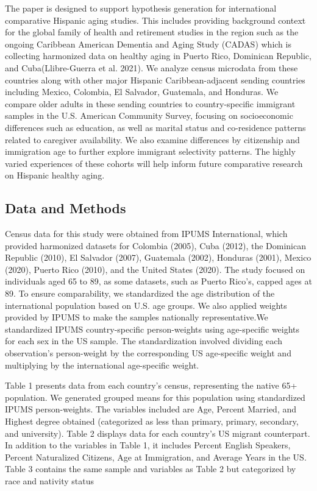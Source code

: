 \documentclass[
]{article}
\begin{document}
The paper is designed to support hypothesis generation for international
comparative Hispanic aging studies. This includes providing background
context for the global family of health and retirement studies in the
region such as the ongoing Caribbean American Dementia and Aging Study
(CADAS) which is collecting harmonized data on healthy aging in Puerto
Rico, Dominican Republic, and Cuba(Llibre-Guerra et al. 2021). We
analyze census microdata from these countries along with other major
Hispanic Caribbean-adjacent sending countries including Mexico,
Colombia, El Salvador, Guatemala, and Honduras. We compare older adults
in these sending countries to country-specific immigrant samples in the
U.S. American Community Survey, focusing on socioeconomic differences
such as education, as well as marital status and co-residence patterns
related to caregiver availability. We also examine differences by
citizenship and immigration age to further explore immigrant selectivity
patterns. The highly varied experiences of these cohorts will help
inform future comparative research on Hispanic healthy aging.

\subsection{Data and Methods}\label{data-and-methods}

Census data for this study were obtained from IPUMS International, which
provided harmonized datasets for Colombia (2005), Cuba (2012), the
Dominican Republic (2010), El Salvador (2007), Guatemala (2002),
Honduras (2001), Mexico (2020), Puerto Rico (2010), and the United
States (2020). The study focused on individuals aged 65 to 89, as some
datasets, such as Puerto Rico's, capped ages at 89. To ensure
comparability, we standardized the age distribution of the international
population based on U.S. age groups. We also applied weights provided by
IPUMS to make the samples nationally representative.We standardized
IPUMS country-specific person-weights using age-specific weights for
each sex in the US sample. The standardization involved dividing each
observation's person-weight by the corresponding US age-specific weight
and multiplying by the international age-specific weight.

Table 1 presents data from each country's census, representing the
native 65+ population. We generated grouped means for this population
using standardized IPUMS person-weights. The variables included are Age,
Percent Married, and Highest degree obtained (categorized as less than
primary, primary, secondary, and university). Table 2 displays data for
each country's US migrant counterpart. In addition to the variables in
Table 1, it includes Percent English Speakers, Percent Naturalized
Citizens, Age at Immigration, and Average Years in the US. Table 3
contains the same sample and variables as Table 2 but categorized by
race and nativity status
\end{document}
